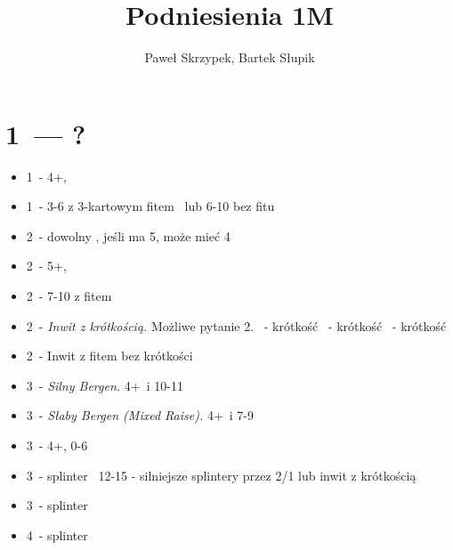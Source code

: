 \documentclass[12pt, a4paper]{article}
\title{Podniesienia 1M}
\author{Paweł Skrzypek, Bartek Słupik}
\begin{document}
    \maketitle
    \section{1\hearts\ --- ?}
    \begin{itemize}
        \item 1\spades\ - 4+\spades, \fonce
        \item 1\nt\ - 3-6 z 3-kartowym fitem \hearts\ lub 6-10 bez fitu \hearts 
        \item 2\clubs\ - dowolny \gf, jeśli ma 5\clubs, może mieć 4\spades 
        \item 2\diams\ - 5+\diams, \gf
        \item 2\hearts\ - 7-10 z fitem \hearts
        \item 2\spades\ - \emph{Inwit z krótkością.} Możliwe pytanie 2\nt. 
        \clubs\ - krótkość \clubs
        \diams\ - krótkość \diams
        \hearts\ - krótkość \spades 
        \item 2\nt\ - Inwit z fitem bez krótkości
        \item 3\clubs\ - \emph{Silny Bergen.} 4+\hearts\ i 10-11
        \item 3\diams\ - \emph{Słaby Bergen (Mixed Raise).} 4+\hearts\ i 7-9
        \item 3\hearts\ - 4+\hearts, 0-6
        \item 3\spades\ - splinter \spades\ 12-15 - silniejsze splintery przez 2/1 lub inwit z krótkością
        \item 3\nt\ - splinter \diams\
        \item 4\clubs\ - splinter \clubs\
    \end{itemize}
\end{document}

